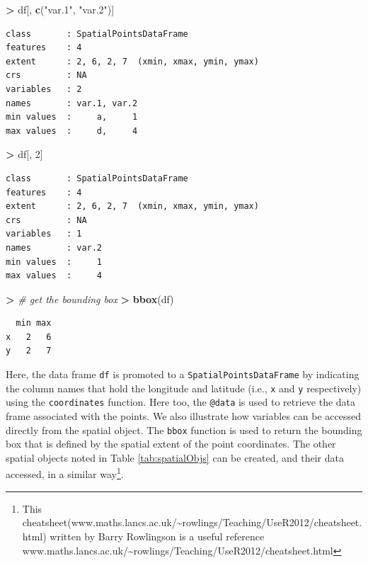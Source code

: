 \documentclass[]{krantz}
\makeatletter
\newenvironment{Shaded}{\begin{snugshade}}{\end{snugshade}}
\newcommand{\CommentTok}[1]{\textcolor[rgb]{0.37,0.37,0.37}{\textit{#1}}}
\newcommand{\DecValTok}[1]{\textcolor[rgb]{0.06,0.06,0.06}{#1}}
\newcommand{\ErrorTok}[1]{\textcolor[rgb]{0.14,0.14,0.14}{\textbf{#1}}}
\newcommand{\KeywordTok}[1]{\textcolor[rgb]{0.27,0.27,0.27}{\textbf{#1}}}
\newcommand{\NormalTok}[1]{#1}
\newcommand{\OperatorTok}[1]{\textcolor[rgb]{0.43,0.43,0.43}{\textbf{#1}}}
\newcommand{\StringTok}[1]{\textcolor[rgb]{0.5,0.5,0.5}{#1}}
\newenvironment{kframe}{%
\medskip{}
\setlength{\fboxsep}{.8em}
 \def\at@end@of@kframe{}%
 \ifinner\ifhmode%
  \def\at@end@of@kframe{\end{minipage}}%
  \begin{minipage}{\columnwidth}%
 \fi\fi%
 \def\FrameCommand##1{\hskip\@totalleftmargin \hskip-\fboxsep
 \colorbox{shadecolor}{##1}\hskip-\fboxsep
     \hskip-\linewidth \hskip-\@totalleftmargin \hskip\columnwidth}%
 \MakeFramed {\advance\hsize-\width
   \@totalleftmargin\z@ \linewidth\hsize
   \@setminipage}}%
 {\par\unskip\endMakeFramed%
 \at@end@of@kframe}
\renewenvironment{Shaded}{\begin{kframe}}{\end{kframe}}
\makeatother
\begin{document}
\begin{Shaded}
\begin{Highlighting}[]
\OperatorTok{>}\StringTok{ }\NormalTok{df[, }\KeywordTok{c}\NormalTok{(}\StringTok{"var.1"}\NormalTok{, }\StringTok{"var.2"}\NormalTok{)]}
\end{Highlighting}
\end{Shaded}

\begin{verbatim}
class       : SpatialPointsDataFrame 
features    : 4 
extent      : 2, 6, 2, 7  (xmin, xmax, ymin, ymax)
crs         : NA 
variables   : 2
names       : var.1, var.2 
min values  :     a,     1 
max values  :     d,     4 
\end{verbatim}

\begin{Shaded}
\begin{Highlighting}[]
\OperatorTok{>}\StringTok{ }\NormalTok{df[, }\DecValTok{2}\NormalTok{]}
\end{Highlighting}
\end{Shaded}

\begin{verbatim}
class       : SpatialPointsDataFrame 
features    : 4 
extent      : 2, 6, 2, 7  (xmin, xmax, ymin, ymax)
crs         : NA 
variables   : 1
names       : var.2 
min values  :     1 
max values  :     4 
\end{verbatim}

\begin{Shaded}
\begin{Highlighting}[]
\OperatorTok{>}\StringTok{ }\CommentTok{# get the bounding box}
\ErrorTok{>}\StringTok{ }\KeywordTok{bbox}\NormalTok{(df)}
\end{Highlighting}
\end{Shaded}

\begin{verbatim}
  min max
x   2   6
y   2   7
\end{verbatim}

Here, the data frame \texttt{df} is promoted to a \texttt{SpatialPointsDataFrame} by indicating the column names that hold the longitude and latitude (i.e., \texttt{x} and \texttt{y} respectively) using the \texttt{coordinates} function. Here too, the \texttt{@data} is used to retrieve the data frame associated with the points. We also illustrate how variables can be accessed directly from the spatial object. The \texttt{bbox} function is used to return the bounding box that is defined by the spatial extent of the point coordinates. The other spatial objects noted in Table \ref{tab:spatialObjs} can be created, and their data accessed, in a similar way\footnote{This cheatsheet(www.maths.lancs.ac.uk/\textasciitilde{}rowlings/Teaching/UseR2012/cheatsheet.html) written by Barry Rowlingson is a useful reference www.maths.lancs.ac.uk/\textasciitilde{}rowlings/Teaching/UseR2012/cheatsheet.html}.
\end{document}
